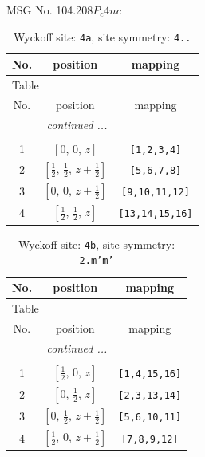 \documentclass[fleqn,8pt]{jsarticle}
\begin{document}
\setcounter{MaxMatrixCols}{32}

\renewcommand{\tablename}{Table~}
\renewcommand{\figurename}{Figure~}
\begin{center}
\LARGE
MSG No. 104.208\quad$P_{c}4nc$
\end{center}
\renewcommand{\arraystretch}{1.2}
\begin{longtable}{ccc}
\caption{Wyckoff site: {\tt 4a}, site symmetry: {\tt 4..}}
 \\
 \hline \hline
No. & position & mapping \\ \hline \endfirsthead

\multicolumn{2}{l}{\tablename\ \thetable{}} \\
 \hline \hline
No. & position & mapping \\ \hline \endhead

 \hline \hline
\multicolumn{2}{r}{\footnotesize\it continued ...} \\ \endfoot

 \hline \hline
\multicolumn{2}{r}{} \\ \endlastfoot

1 & $\left[ 0,\, 0,\, z \right]$ & {\tt [1,2,3,4]} \\ \hline
2 & $\left[ \frac{1}{2},\, \frac{1}{2},\, z + \frac{1}{2} \right]$ & {\tt [5,6,7,8]} \\ \hline
3 & $\left[ 0,\, 0,\, z + \frac{1}{2} \right]$ & {\tt [9,10,11,12]} \\ \hline
4 & $\left[ \frac{1}{2},\, \frac{1}{2},\, z \right]$ & {\tt [13,14,15,16]} \\
\end{longtable}
\renewcommand{\arraystretch}{1.2}
\begin{longtable}{ccc}
\caption{Wyckoff site: {\tt 4b}, site symmetry: {\tt 2.m'm'}}
 \\
 \hline \hline
No. & position & mapping \\ \hline \endfirsthead

\multicolumn{2}{l}{\tablename\ \thetable{}} \\
 \hline \hline
No. & position & mapping \\ \hline \endhead

 \hline \hline
\multicolumn{2}{r}{\footnotesize\it continued ...} \\ \endfoot

 \hline \hline
\multicolumn{2}{r}{} \\ \endlastfoot

1 & $\left[ \frac{1}{2},\, 0,\, z \right]$ & {\tt [1,4,15,16]} \\ \hline
2 & $\left[ 0,\, \frac{1}{2},\, z \right]$ & {\tt [2,3,13,14]} \\ \hline
3 & $\left[ 0,\, \frac{1}{2},\, z + \frac{1}{2} \right]$ & {\tt [5,6,10,11]} \\ \hline
4 & $\left[ \frac{1}{2},\, 0,\, z + \frac{1}{2} \right]$ & {\tt [7,8,9,12]} \\
\end{longtable}
\end{document}
